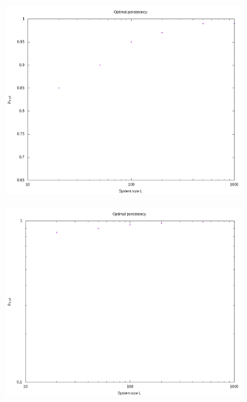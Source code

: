 \documentclass[]{scrartcl}
\begin{document}
 \begin{figure}[!hbt]
\centering
\begin{subfigure}{0.35\textwidth}
 \includegraphics[width=\textwidth]{./fig/sysL/p_opt_logx.png}
\end{subfigure}
\begin{subfigure}{0.35\textwidth}
 \includegraphics[width=\textwidth]{./fig/sysL/p_opt_logxy.png}
\end{subfigure}

\end{figure}
\end{document}
